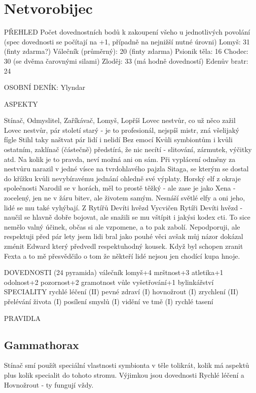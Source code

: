 \section{Netvorobijec}
\label{sec:netvorobijec}

PŘEHLED
Počet dovednostních bodů k zakoupení všeho u jednotlivých povolání (spec dovednosti se počítají na +1, případně na nejnižší nutné úrovni)
Lomyš: 31 (finty zdarma?)
Válečník (průměrný): 20 (finty zdarma)
Psionik těla: 16
Chodec: 30 (se dvěma čarovnými silami)
Zloděj: 33 (má hodně dovedností)
Edenův bratr: 24 


OSOBNÍ DENÍK: Ylyndar

ASPEKTY

Stínač, Odmyslitel, Zaříkávač, Lomyš, Lopříš
Lovec nestvůr, co už něco zažil
Lovec nestvůr, pár století starý - je to profesionál, nejspíš mistr, zná všelijaký fígle
Stihl taky naštvat pár lidí i nelidí
Bez emocí
Kvůli symbiontům i kvůli ostatním, zaklínač (částečně) předstírá, že nic necítí - slitování, zármutek, výčitky atd. Na kolik je to pravda, neví možná ani on sám. Při vyplácení odměny za nestvůru narazil v jedné vísce na tvrdohlavého pajzla Sitaga, se kterým se dostal do křížku kvůli nevybíravému jednání ohledně své výplaty.
Horský elf z okraje společnosti
Narodil se v horách, měl to prostě těžký - ale zase je jako Xena - zocelený, jen ne v žáru bitev, ale životem samým. Nesnáší světlé elfy a oni jeho, lidé se mu také vyhýbají.
Z Rytířů Devíti hvězd
Vycvičen Rytíři Devíti hvězd - naučil se hlavně dobře bojovat, ale snažili se mu vštípit i jakýsi kodex cti. To sice nemělo valný účinek, občas si ale vzpomene, a to pak zabolí.
Nepodporuji, ale respektuji
před pár lety jsem lidi bral jako pouhé věci avšak můj názor dokázal zménit Edward který předvedl respektuhodný kousek. Když byl schopen zranit Fexta a to mě přesvědčilo o tom že někteří lidé nejsou jen chodící kupa hnoje.


DOVEDNOSTI (24 pyramida)
válečník lomyš+4
mrštnost+3
atletika+1
odolnost+2
pozornost+2
gramotnost
vůle
vyšetřování+1
bylinkářství
SPECIALITY
rychlé léčení (II)
pevné zdraví (I)
hovnožrout (I)
zrychlení (II)
přelévání života (I)
posílení smyslů (I)
vidění ve tmě (I)
rychlé tasení


PRAVIDLA

\subsection{Gammathorax}
\label{sec:lopr-gamma}

Stínač smí použít speciální vlastnosti symbionta v těle tolikrát, kolik má aspektů plus kolik specialit do tohoto stromu. Výjimkou jsou dovednosti Rychlé léčení a Hovnožrout - ty fungují vždy.\\


